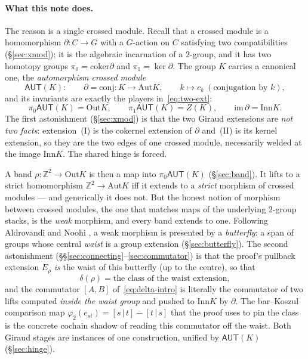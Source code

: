 \documentclass[11pt]{article}
\theoremstyle{definition}
\newcommand{\Z}{\mathbb{Z}}
\newcommand{\Aut}{\mathrm{Aut}}
\newcommand{\Inn}{\mathrm{Inn}}
\newcommand{\Out}{\mathrm{Out}}
\newcommand{\conj}{\mathrm{conj}}
\newcommand{\coker}{\mathrm{coker}}
\newcommand{\AUT}{\mathsf{AUT}}
\newcommand{\pizero}{\pi_0}
\newcommand{\pione}{\pi_1}
\begin{document}
\paragraph{What this note does.} The reason is a single crossed module. Recall that a crossed
module is a homomorphism $\partial\colon C\to G$ with a $G$-action on $C$ satisfying two
compatibilities (\S\ref{sec:xmod}); it is the algebraic incarnation of a $2$-group, and it has two
homotopy groups $\pizero=\coker\partial$ and $\pione=\ker\partial$. The group $K$ carries a
canonical one, the \emph{automorphism crossed module}
\[
\AUT(K):\qquad \partial=\conj\colon K\longrightarrow \Aut K,\qquad k\mapsto c_k\ (\text{conjugation by }k),
\]
and its invariants are exactly the players in~\eqref{eq:two-ext}:
\[
\pizero\AUT(K)=\Out K,\qquad \pione\AUT(K)=Z(K),\qquad \mathrm{im}\,\partial=\Inn K.
\]
The first astonishment (\S\ref{sec:xmod}) is that the two Giraud extensions are \emph{not two
facts}: extension~(I) is the cokernel extension of $\partial$ and~(II) is its kernel extension, so
they are the two edges of one crossed module, necessarily welded at the image $\Inn K$. The shared
hinge is forced.

A band $\rho\colon\Z^2\to\Out K$ is then a map into $\pizero\AUT(K)$ (\S\ref{sec:band}). It lifts
to a strict homomorphism $\Z^2\to\Aut K$ iff it extends to a \emph{strict} morphism of crossed
modules --- and generically it does not. But the honest notion of morphism between crossed modules,
the one that matches maps of the underlying $2$-group stacks, is the \emph{weak} morphism, and
every band extends to one. Following Aldrovandi and Noohi \cite{butterflies}, a weak morphism is
presented by a \emph{butterfly}: a span of groups whose central \emph{waist} is a group extension
(\S\ref{sec:butterfly}). The second astonishment (\S\S\ref{sec:connecting}--\ref{sec:commutator})
is that the proof's pullback extension $E_\rho$ \emph{is} the waist of this butterfly (up to the
centre), so that
\[
\delta(\rho)=\text{the class of the waist extension},
\]
and the commutator $[A,B]$ of~\eqref{eq:delta-intro} is literally the commutator of two lifts
computed \emph{inside the waist group} and pushed to $\Inn K$ by $\partial$. The bar--Koszul
comparison map $\varphi_2(e_{st})=[s\,|\,t]-[t\,|\,s]$ that the proof uses to pin the class is the
concrete cochain shadow of reading this commutator off the waist. Both Giraud stages are instances
of one construction, unified by $\AUT(K)$ (\S\ref{sec:hinge}).
\end{document}
